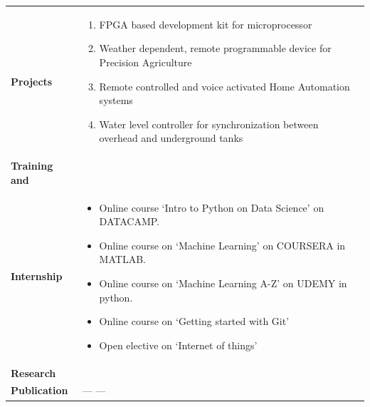\documentclass[a4paper,11pt,oneside]{article}
\begin{document}
\begin{tabular}{@{} p{} p{\textwidth}}
     \textbf{\large{Projects}}    
         & \vspace{-1em}
           \begin{enumerate}
                \setlength\itemsep{0.1em}
                \item FPGA based development kit for microprocessor
                \item Weather dependent, remote programmable device for Precision Agriculture
                \item Remote controlled and voice activated Home Automation
                systems
                \item Water level controller for synchronization between overhead and underground tanks
            \end{enumerate} \\
     \textbf{\large{Training and}} & \\
     \textbf{\large{Internship}}
         & \vspace{-3em}
           \begin{itemize}
                \setlength\itemsep{0.1em}
                \item Online course ‘Intro to Python on Data Science’ on DATACAMP.
                \item Online course on ‘Machine Learning’ on COURSERA in MATLAB.
                \item Online course on ‘Machine Learning A-Z’ on UDEMY in python.
                \item Online course on ‘Getting started with Git’
                \item Open elective on ‘Internet of things’
            \end{itemize}  \\
     \textbf{\large{Research}} & \\
     \textbf{\large{Publication}} & \hspace{1em} --- ---  \\
 \end{tabular}
 
\end{document}
